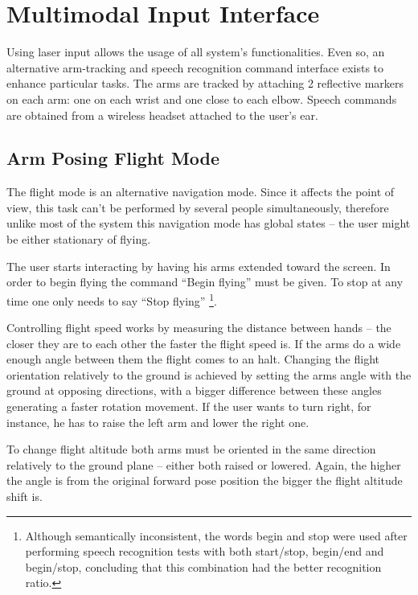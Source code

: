 

\section{Multimodal Input Interface}

Using laser input allows the usage of all system's functionalities.
Even so, an alternative arm-tracking and speech recognition command interface exists to enhance particular tasks.
The arms are tracked by attaching 2 reflective markers on each arm: one on each wrist and one close to each elbow.
Speech commands are obtained from a wireless headset attached to the user's ear.


\subsection{Arm Posing Flight Mode}

The flight mode is an alternative navigation mode. Since it affects the point of view, this task can't be performed by
several people simultaneously, therefore unlike most of the system this navigation mode has global states
-- the user might be either stationary of flying.

The user starts interacting by having his arms extended toward the screen.
In order to begin flying the command ``Begin flying'' must be given.
To stop at any time one only needs to say ``Stop flying''
\footnote{Although semantically inconsistent, the words begin and stop were used after performing speech recognition
tests with both start/stop, begin/end and begin/stop, concluding that this combination had the better recognition ratio.}.

Controlling flight speed works by measuring the distance between hands -- the closer they are to each other the faster
the flight speed is. If the arms do a wide enough angle between them the flight comes to an halt.
Changing the flight orientation relatively to the ground is achieved by setting the arms angle with the ground at opposing directions,
with a bigger difference between these angles generating a faster rotation movement. If the user wants to turn right, for instance,
he has to raise the left arm and lower the right one.

To change flight altitude both arms must be oriented in the same direction relatively to the ground plane
-- either both raised or lowered. Again, the higher the angle is from the original forward pose position
the bigger the flight altitude shift is.

